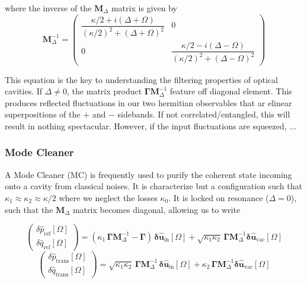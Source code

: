 where the inverse of the $\mathbf{M}_\Delta$ matrix is given by 
\begin{equation}
  \mathbf{M}^{-1}_\Delta = \begin{pmatrix}
\dfrac{\kappa/2+i(\Delta+\Omega)}{\left(\kappa/2\right)^2+(\Delta+\Omega)^2} & 0 \\
0 & \dfrac{\kappa/2-i(\Delta-\Omega)}{\left(\kappa/2\right)^2+(\Delta-\Omega)^2}
\end{pmatrix}
\end{equation}

This equation is the key to understanding the filtering properties of optical cavities. If $\Delta \neq 0 $, the matrix product $\mathbf{\Gamma} \mathbf{M}^{-1}_\Delta $ feature off diagonal element. This produces reflected fluctuations in our two hermitian observables that ar elinear superpositions of the $+$ and $-$ sidebands. If not correlated/entangled, this will result in nothing spectacular. However, if the input fluctuations are squeezed, ... 

\subsubsection{Mode Cleaner}
A Mode Cleaner (MC) is frequently used to purify the coherent state incoming onto a cavity from classical noises. It is characterize but a configuration such that $\kappa_1 \approx \kappa_2 \approx \kappa/2$ where we neglect the losses $\kappa_0$. It is locked on resonance ($\Delta=0$), such that the $\mathbf{M}_\Delta$ matrix becomes diagonal, allowing us to write  

\begin{equation}
  \begin{pmatrix}
  \delta \hat{p}_{\mathrm{ref}}[\Omega] \\[2pt]
\delta \hat{q}_{\mathrm{ref}}[\Omega]
\end{pmatrix}  = ( \kappa_1 \, \mathbf{\Gamma} \mathbf{M}^{-1}_\Delta - \mathbf{\Gamma} ) \, \mathbf{\delta \hat{u}_{\mathrm{in}}}[\Omega] +  \sqrt{\kappa_1 \kappa_2} \,\mathbf{\Gamma}  \mathbf{M}^{-1}_\Delta  \mathbf{\delta \hat{u}_{\mathrm{vac}}}[\Omega] 
\end{equation}
\begin{equation}
  \begin{pmatrix}
  \delta \hat{p}_{\mathrm{trans}}[\Omega] \\[2pt]
\delta \hat{q}_{\mathrm{trans}}[\Omega]
\end{pmatrix}  = \sqrt{\kappa_1 \kappa_2} \, \mathbf{\Gamma} \mathbf{M}^{-1}_\Delta \, \mathbf{\delta \hat{u}_{\mathrm{in}}}[\Omega] +  \kappa_2 \,\mathbf{\Gamma}  \mathbf{M}^{-1}_\Delta  \mathbf{\delta \hat{u}_{\mathrm{vac}}}[\Omega] 
\end{equation}



